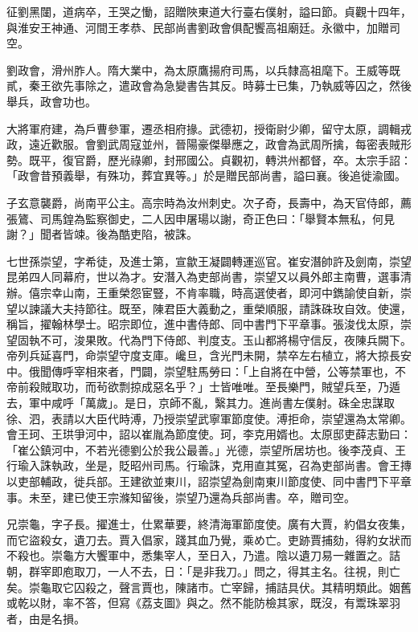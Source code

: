 \begin{pinyinscope}
 征劉黑闥，道病卒，王哭之慟，詔贈陜東道大行臺右僕射，謚曰節。貞觀十四年，與淮安王神通、河間王孝恭、民部尚書劉政會俱配饗高祖廟廷。永徽中，加贈司空。



 劉政會，滑州胙人。隋大業中，為太原鷹揚府司馬，以兵隸高祖麾下。王威等既貳，秦王欲先事除之，遣政會為急變書告其反。時募士已集，乃執威等囚之，然後舉兵，政會功也。



 大將軍府建，為戶曹參軍，遷丞相府掾。武德初，授衛尉少卿，留守太原，調輯戎政，遠近歡服。會劉武周寇並州，晉陽豪傑舉應之，政會為武周所擒，每密表賊形勢。既平，復官爵，歷光祿卿，封邢國公。貞觀初，轉洪州都督，卒。太宗手詔：「政會昔預義舉，有殊功，葬宜異等。」於是贈民部尚書，謚曰襄。後追徙渝國。



 子玄意襲爵，尚南平公主。高宗時為汝州刺史。次子奇，長壽中，為天官侍郎，薦張鷟、司馬鍠為監察御史，二人因申屠瑒以謝，奇正色曰：「舉賢本無私，何見謝？」聞者皆竦。後為酷吏陷，被誅。



 七世孫崇望，字希徒，及進士第，宣歙王凝闢轉運巡官。崔安潛帥許及劍南，崇望昆弟四人同幕府，世以為才。安潛入為吏部尚書，崇望又以員外郎主南曹，選事清辦。僖宗幸山南，王重榮怨宦豎，不肯率職，時高選使者，即河中鐫諭使自新，崇望以諫議大夫持節往。既至，陳君臣大義動之，重榮順服，請誅硃玫自效。使還，稱旨，擢翰林學士。昭宗即位，進中書侍郎、同中書門下平章事。張浚伐太原，崇望固執不可，浚果敗。代為門下侍郎、判度支。玉山都將楊守信反，夜陳兵闕下。帝列兵延喜門，命崇望守度支庫。巉旦，含光門未開，禁卒左右植立，將大掠長安中。俄聞傳呼宰相來者，門闢，崇望駐馬勞曰：「上自將在中營，公等禁軍也，不帝前殺賊取功，而茍欲剽掠成惡名乎？」士皆唯唯。至長樂門，賊望兵至，乃遁去，軍中咸呼「萬歲」。是日，京師不亂，繄其力。進尚書左僕射。硃全忠謀取徐、泗，表請以大臣代時溥，乃授崇望武寧軍節度使。溥拒命，崇望還為太常卿。會王珂、王珙爭河中，詔以崔胤為節度使。珂，李克用婿也。太原邸吏薛志勤曰：「崔公鎮河中，不若光德劉公於我公最善。」光德，崇望所居坊也。後李茂貞、王行瑜入誅執政，坐是，貶昭州司馬。行瑜誅，克用直其冤，召為吏部尚書。會王摶以吏部輔政，徙兵部。王建欲並東川，詔崇望為劍南東川節度使、同中書門下平章事。未至，建已使王宗滌知留後，崇望乃還為兵部尚書。卒，贈司空。



 兄崇龜，字子長。擢進士，仕累華要，終清海軍節度使。廣有大賈，約倡女夜集，而它盜殺女，遺刀去。賈入倡家，踐其血乃覺，乘め亡。吏跡賈捕劾，得約女狀而不殺也。崇龜方大饗軍中，悉集宰人，至日入，乃遣。陰以遺刀易一雜置之。詰朝，群宰即庖取刀，一人不去，日：「是非我刀。」問之，得其主名。往視，則亡矣。崇龜取它囚殺之，聲言賈也，陳諸市。亡宰歸，捕詰具伏。其精明類此。姻舊或乾以財，率不答，但寫《荔支圖》與之。然不能防檢其家，既沒，有鬻珠翠羽者，由是名損。




\end{pinyinscope}
